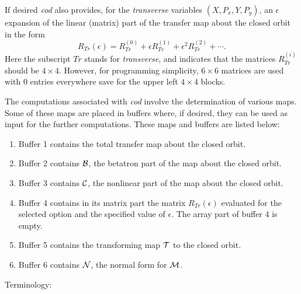 If desired {\em cod} also provides, for the {\em transverse} variables
$(X, P_x, Y, P_y)$, an $\epsilon$ expansion of the linear (matrix) part
of the transfer map about the closed orbit in the form
\begin{equation}
R_{Tr} (\epsilon ) = R^{(0)}_{Tr} + \epsilon R^{(1)}_{Tr} + \epsilon^2 R^{(2)}_{Tr} +
\cdots .
\end{equation}
Here the subscript $Tr$ stands for {\em transverse}, and indicates that
the matrices $R^{(i)}_{Tr}$ should be $4 \times 4$.  However, for
programming simplicity, $6 \times 6$ matrices are used with 0 entries
everywhere save for the upper left $4 \times 4$ blocks.

The computations associated with {\em cod} involve the determination of
various maps.  Some of these maps are placed in buffers where, if
desired, they can be used as input for the further computations.  These
maps and buffers are listed below:

\begin{enumerate}
           \item  Buffer 1 contains the total transfer map about the closed
                  orbit.

           \item  Buffer 2 contains ${\cal B}$, the betatron part of the map about
                  the closed orbit.

           \item  Buffer 3 contains ${\cal C}$, the nonlinear part of the map about
                  the closed orbit.

           \item  Buffer 4 contains in its matrix part the matrix
		   $R_{Tr}(\epsilon )$ evaluated for the selected option and the specified
		   value of $\epsilon$.  The array part of buffer 4 is empty.

           \item  Buffer 5 contains the transforming map ${\cal T}$ to the closed
                  orbit.

		   \item  Buffer 6 contains ${\cal N}$, the normal form for ${\cal M}$.
\end{enumerate}

\vspace{5mm}
Terminology:
\vspace{2mm}

